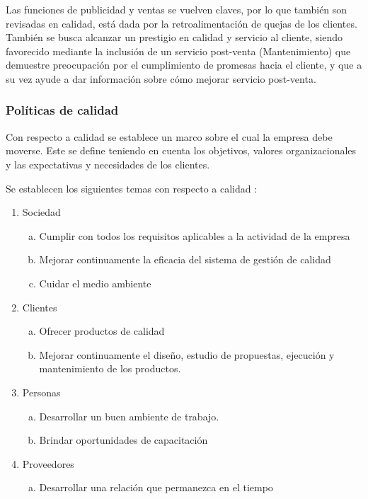 	Las funciones de publicidad y ventas se vuelven claves, por lo que también son revisadas en calidad, está dada por la retroalimentación de quejas de los clientes. También se busca alcanzar un prestigio en calidad y servicio al cliente, siendo favorecido mediante la inclusión de un servicio post-venta (Mantenimiento) que demuestre preocupación por el cumplimiento de promesas hacia el cliente, y que a su vez ayude a dar información sobre cómo mejorar servicio post-venta.
	
	
	\subsubsection{Políticas de calidad}
		
		Con respecto a calidad se establece un marco sobre el cual la empresa debe moverse. Este se define teniendo en cuenta los objetivos, valores organizacionales y las expectativas y necesidades de los clientes.
		
		
		Se establecen los siguientes temas con respecto a calidad :
		
		\begin{enumerate}[1)]
		\item Sociedad
		  \begin{enumerate}[a)]
		  \item Cumplir con todos los requisitos aplicables a la actividad de la empresa
		  \item  Mejorar continuamente la eficacia del sistema de gestión de calidad
		  \item  Cuidar el medio ambiente
		  \end{enumerate}
		\item Clientes
		  \begin{enumerate}[a)]
		  \item Ofrecer productos de calidad
		  \item Mejorar continuamente el diseño, estudio de propuestas, ejecución y mantenimiento de los productos.
		  \end{enumerate}
		\item Personas
		  \begin{enumerate}[a)]
		  \item Desarrollar un buen ambiente de trabajo.
		  \item Brindar oportunidades de capacitación
		  \end{enumerate}
		\item Proveedores
		  \begin{enumerate}[a)]
		  \item Desarrollar una relación que permanezca en el tiempo
		  \end{enumerate}
		\end{enumerate}
	
